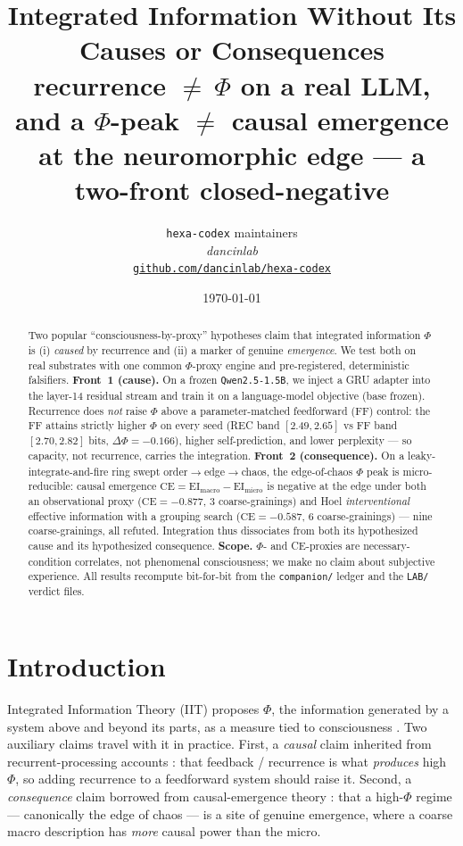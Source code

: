 \documentclass[11pt,a4paper]{article}
\title{
  \textbf{Integrated Information Without Its Causes or Consequences}\\[4pt]
  \large recurrence $\neq\ \Phi$ on a real LLM, and a $\Phi$-peak $\neq$ causal
  emergence at the neuromorphic edge --- a two-front closed-negative
}
\author{
  \texttt{hexa-codex} maintainers\\
  \normalsize\textit{dancinlab}\\[2pt]
  \normalsize\href{https://github.com/dancinlab/hexa-codex}{\texttt{github.com/dancinlab/hexa-codex}}
}
\date{\today}
\begin{document}
\maketitle

\begin{abstract}
Two popular ``consciousness-by-proxy'' hypotheses claim that integrated
information $\Phi$ is (i) \emph{caused} by recurrence and (ii) a marker of
genuine \emph{emergence}. We test both on real substrates with one common
$\Phi$-proxy engine and pre-registered, deterministic falsifiers. \textbf{Front~1
(cause).} On a frozen \texttt{Qwen2.5-1.5B}, we inject a GRU adapter into the
layer-14 residual stream and train it on a language-model objective (base
frozen). Recurrence does \emph{not} raise $\Phi$ above a parameter-matched
feedforward (FF) control: the FF attains strictly higher $\Phi$ on every seed
(REC band $[2.49,2.65]$ vs FF band $[2.70,2.82]$ bits, $\Delta\Phi=-0.166$),
higher self-prediction, and lower perplexity --- so capacity, not recurrence,
carries the integration. \textbf{Front~2 (consequence).} On a
leaky-integrate-and-fire ring swept order$\to$edge$\to$chaos, the edge-of-chaos
$\Phi$ peak is micro-reducible: causal emergence $\mathrm{CE}=\mathrm{EI}_{\text{macro}}-\mathrm{EI}_{\text{micro}}$
is negative at the edge under both an observational proxy ($\mathrm{CE}=-0.877$,
3 coarse-grainings) and Hoel \emph{interventional} effective information with a
grouping search ($\mathrm{CE}=-0.587$, 6 coarse-grainings) --- nine
coarse-grainings, all refuted. Integration thus dissociates from both its
hypothesized cause and its hypothesized consequence. \textbf{Scope.} $\Phi$- and
CE-proxies are necessary-condition correlates, not phenomenal consciousness; we
make no claim about subjective experience. All results recompute bit-for-bit
from the \texttt{companion/} ledger and the \texttt{LAB/} verdict files.
\end{abstract}

\section{Introduction}
\label{sec:intro}

Integrated Information Theory (IIT) proposes $\Phi$, the information generated by
a system above and beyond its parts, as a measure tied to consciousness
\citep{tononi2016iit,oizumi2014iit3,albantakis2023iit4}. Two auxiliary claims
travel with it in practice. First, a \emph{causal} claim inherited from
recurrent-processing accounts \citep{lamme2006}: that feedback / recurrence is
what \emph{produces} high $\Phi$, so adding recurrence to a feedforward system
should raise it. Second, a \emph{consequence} claim borrowed from
causal-emergence theory \citep{hoel2013,hoel2017}: that a high-$\Phi$ regime ---
canonically the edge of chaos \citep{langton1990,beggs2003} --- is a site of
genuine emergence, where a coarse macro description has \emph{more} causal power
than the micro.
\end{document}
